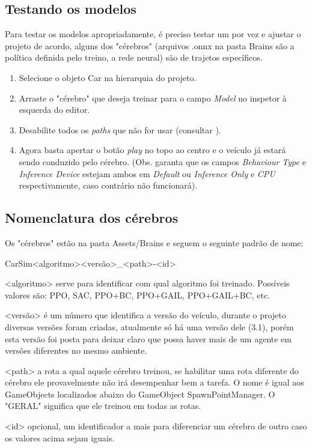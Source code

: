 \begin{apendicesenv}
\subsection*{Testando os modelos}
Para testar os modelos apropriadamente, é preciso testar um por vez e ajustar o projeto de acordo, alguns dos "cérebros"{} (arquivos .onnx na pasta Brains são a política definida pelo treino, a rede neural) são de trajetos específicos.

\begin{enumerate}
    \item Selecione o objeto Car na hierarquia do projeto.
    \item Arraste o "cérebro"{} que deseja treinar para o campo \textit{Model} no inspetor à esquerda do editor.
    \item Desabilite todos os \textit{paths} que não for usar (consultar ).
    \item Agora basta apertar o botão \textit{play} no topo ao centro e o veículo já estará sendo conduzido pelo cérebro. (Obs. garanta que os campos \textit{Behaviour Type} e \textit{Inference Device} estejam ambos em \textit{Default}  ou  \textit{Inference Only} e \textit{CPU} respectivamente, caso contrário não funcionará).
\end{enumerate}

\subsection*{Nomenclatura dos cérebros}\label{nomenclatura}
Os "cérebros"{} estão na pasta Assets/Brains e seguem o seguinte padrão de nome:

CarSim<algoritmo><versão>\_<path>-<id>

<algoritmo> serve para identificar com qual algoritmo foi treinado. Possíveis valores são: PPO, SAC, PPO+BC, PPO+GAIL, PPO+GAIL+BC, etc. 

<versão> é um número que identifica a versão do veículo, durante o projeto diversas versões foram criadas, atualmente só há uma versão dele (3.1), porém esta versão foi posta para deixar claro que possa haver mais de um agente em versões diferentes no mesmo ambiente.

<path> a rota a qual aquele cérebro treinou, se habilitar uma rota diferente do cérebro ele provavelmente não irá desempenhar bem a tarefa. O nome é igual aos GameObjects localizados abaixo do GameObject SpawnPointManager. O "GERAL"{} significa que ele treinou em todas as rotas.

<id> opcional, um identificador a mais para diferenciar um cérebro de outro caso os valores acima sejam iguais.



\end{apendicesenv}
